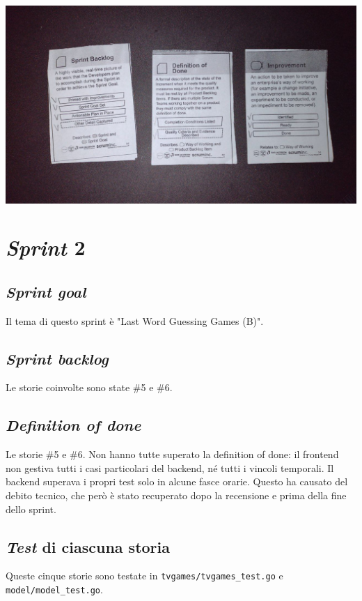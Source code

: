 \documentclass{article}
\begin{document}
\includegraphics[width=\textwidth]{essence-1.jpg}

\section{\emph{Sprint} 2}

\subsection{\emph{Sprint goal}}

Il tema di questo sprint è "Last Word Guessing Games (B)".

\subsection{\emph{Sprint backlog}}

Le storie coinvolte sono state \#5 e \#6.

\subsection{\emph{Definition of done}}

Le storie \#5 e \#6. Non hanno tutte superato la definition of
done: il frontend non gestiva tutti i casi particolari del backend, né tutti i
vincoli temporali. Il backend superava i propri test solo in alcune fasce
orarie. Questo ha causato del debito tecnico, che però è stato recuperato dopo
la recensione e prima della fine dello sprint.

\subsection{\emph{Test} di ciascuna storia}

Queste cinque storie sono testate in \verb!tvgames/tvgames_test.go! e
\verb!model/model_test.go!.
\end{document}
